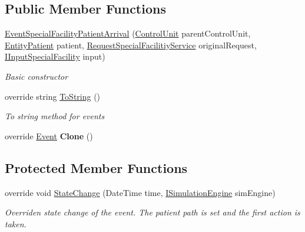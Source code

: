 \subsection*{Public Member Functions}
\begin{DoxyCompactItemize}
\item 
\hyperlink{class_general_health_care_elements_1_1_special_facility_1_1_event_special_facility_patient_arrival_af3c713c25d970fbac1d577f0262ad6cc}{Event\+Special\+Facility\+Patient\+Arrival} (\hyperlink{class_simulation_core_1_1_h_c_c_m_elements_1_1_control_unit}{Control\+Unit} parent\+Control\+Unit, \hyperlink{class_general_health_care_elements_1_1_entities_1_1_entity_patient}{Entity\+Patient} patient, \hyperlink{class_general_health_care_elements_1_1_special_facility_1_1_request_special_facilitiy_service}{Request\+Special\+Facilitiy\+Service} original\+Request, \hyperlink{interface_general_health_care_elements_1_1_special_facility_1_1_i_input_special_facility}{I\+Input\+Special\+Facility} input)
\begin{DoxyCompactList}\small\item\em Basic constructor \end{DoxyCompactList}\item 
override string \hyperlink{class_general_health_care_elements_1_1_special_facility_1_1_event_special_facility_patient_arrival_a285dee6544a66a6aaddde2e7043e9ef0}{To\+String} ()
\begin{DoxyCompactList}\small\item\em To string method for events \end{DoxyCompactList}\item 
override \hyperlink{class_simulation_core_1_1_h_c_c_m_elements_1_1_event}{Event} {\bfseries Clone} ()\hypertarget{class_general_health_care_elements_1_1_special_facility_1_1_event_special_facility_patient_arrival_aa7b3ac795af8c9e33a634f7257c86e9c}{}\label{class_general_health_care_elements_1_1_special_facility_1_1_event_special_facility_patient_arrival_aa7b3ac795af8c9e33a634f7257c86e9c}

\end{DoxyCompactItemize}
\subsection*{Protected Member Functions}
\begin{DoxyCompactItemize}
\item 
override void \hyperlink{class_general_health_care_elements_1_1_special_facility_1_1_event_special_facility_patient_arrival_ae84fc28293ac8876d176cb5e9389229d}{State\+Change} (Date\+Time time, \hyperlink{interface_simulation_core_1_1_simulation_classes_1_1_i_simulation_engine}{I\+Simulation\+Engine} sim\+Engine)
\begin{DoxyCompactList}\small\item\em Overriden state change of the event. The patient path is set and the first action is taken. \end{DoxyCompactList}\end{DoxyCompactItemize}
